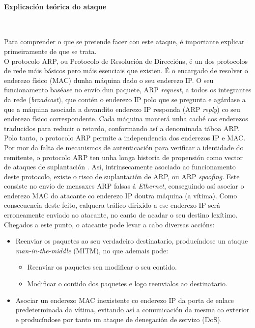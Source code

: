 \paragraph{Explicación teórica do ataque}~~

Para comprender o que se pretende facer con este ataque, é importante explicar primeiramente de que se trata.\\

O protocolo \gls{ARP}, ou Protocolo de Resolución de Direccións, é un dos protocolos de rede máis básicos pero máis esenciais que existen. É o encargado de resolver o enderezo físico (\gls{MAC}) dunha máquina dado o seu enderezo \gls{IP}. O seu funcionamento baséase no envío dun paquete, \gls{ARP} \textit{request}, a todos os integrantes da rede (\textit{broadcast}), que contén o enderezo \gls{IP} polo que se pregunta e agárdase a que a máquina asociada a devandito enderezo \gls{IP} responda (\gls{ARP} \textit{reply}) co seu enderezo físico correspondente. Cada máquina manterá unha caché cos enderezos traducidos para reducir o retardo, conformando así a denominada táboa \gls{ARP}. Polo tanto, o protocolo \gls{ARP} permite a independencia dos enderezos \gls{IP} e \gls{MAC}.\\

Por mor da falta de mecanismos de autenticación para verificar a identidade do remitente, o protocolo \gls{ARP} ten unha longa historia de propensión como vector de ataques de suplantación \cite{detectingARPSpoofing}. Así, intrinsecamente asociado ao funcionamento deste protocolo, existe o risco de suplantación de \gls{ARP}, ou \gls{ARP} \textit{spoofing}. Este consiste no envío de mensaxes \gls{ARP} falsas á \textit{Ethernet}, conseguindo así asociar o enderezo \gls{MAC} do atacante co enderezo \gls{IP} doutra máquina (a vítima). Como consecuencia deste feito, calquera tráfico dirixido a ese enderezo IP será erroneamente enviado ao atacante, no canto de acadar o seu destino lexítimo.\\

Chegados a este punto, o atacante pode levar a cabo diversas accións:

\begin{itemize}
\item Reenviar os paquetes ao seu verdadeiro destinatario, producíndose un ataque \textit{man-in-the-middle} (MITM), no que ademais pode:
    \begin{itemize}
    \item Reenviar os paquetes sen modificar o seu contido.
    \item Modificar o contido dos paquetes e logo reenvialos ao destinatario.
    \end{itemize}
\item Asociar un enderezo \gls{MAC} inexistente co enderezo \gls{IP} da porta de enlace predeterminada da vítima, evitando así a comunicación da mesma co exterior e producíndose por tanto un ataque de denegación de servizo (\gls{DoS}).
\end{itemize}

